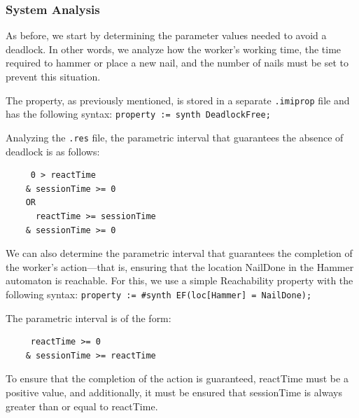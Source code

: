 \subsubsection{System Analysis}

As before, we start by determining the parameter values needed to avoid a deadlock. In other words, we analyze how the worker's working time, the time required to hammer or place a new nail, and the number of nails must be set to prevent this situation.

The property, as previously mentioned, is stored in a separate \texttt{.imiprop} file and has the following syntax: \texttt{property := synth DeadlockFree;}

Analyzing the \texttt{.res} file, the parametric interval that guarantees the absence of deadlock is as follows:

\begin{verbatim}
     0 > reactTime
    & sessionTime >= 0
    OR
      reactTime >= sessionTime
    & sessionTime >= 0
\end{verbatim}

We can also determine the parametric interval that guarantees the completion of the worker's action—that is, ensuring that the location NailDone in the Hammer automaton is reachable. For this, we use a simple Reachability property with the following syntax: \texttt{property := \#synth EF(loc[Hammer] = NailDone);}

The parametric interval is of the form:

\begin{verbatim}
     reactTime >= 0
    & sessionTime >= reactTime
\end{verbatim}

To ensure that the completion of the action is guaranteed, reactTime must be a positive value, and additionally, it must be ensured that sessionTime is always greater than or equal to reactTime.


